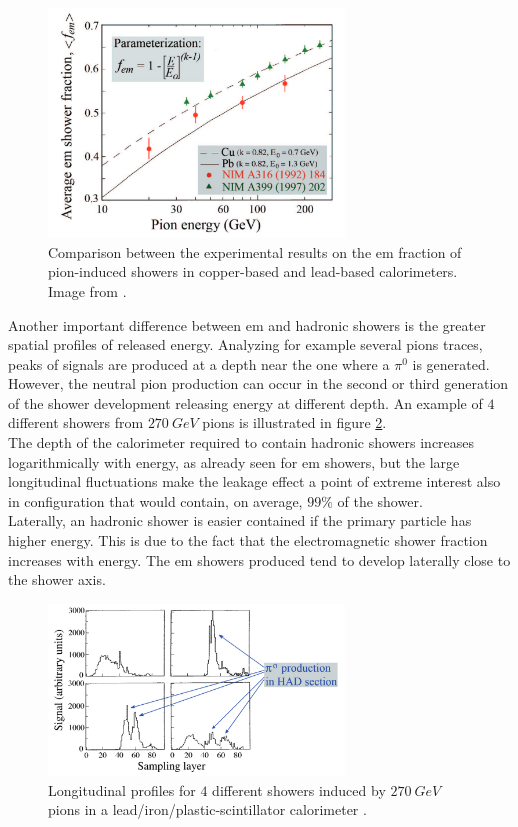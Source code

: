 \begin{figure}
	\centering
	\includegraphics[width=0.7\textwidth]{IMG/Cap2/f_em.png}
	\caption{Comparison between the experimental results on the em fraction of pion-induced showers in copper-based and lead-based calorimeters. Image from \cite{fem_par}.}
	\label{fig:f_em}
\end{figure}

Another important difference between em and hadronic showers is the greater spatial profiles of released energy. Analyzing for example several pions traces, peaks of signals are produced at a depth near the one where a $\pi^0$ is generated. However, the neutral pion production can occur in the second or third generation of the shower development releasing energy at different depth. An example of $4$ different showers from $270\ GeV$ pions is illustrated in figure \ref{fig:had_start}.\\
The depth of the calorimeter required to contain hadronic showers increases logarithmically with energy, as already seen for em showers, but the large longitudinal fluctuations make the leakage effect a point of extreme interest also in configuration that would contain, on average, $99\%$ of the shower.\\
Laterally, an hadronic shower is easier contained if the primary particle has higher energy. This is due to the fact that the electromagnetic shower fraction increases with energy. The em showers produced tend to develop laterally close to the shower axis.
 
 \begin{figure}
	\centering
	\includegraphics[width=0.7\textwidth]{IMG/Cap2/had_start.png}
	\caption{Longitudinal  profiles  for  $4$  different  showers  induced  by  $270\ GeV$  pions  in  a  lead/iron/plastic-scintillator calorimeter \cite{Wigmans_art_of_cal}.}
	\label{fig:had_start}
\end{figure}

